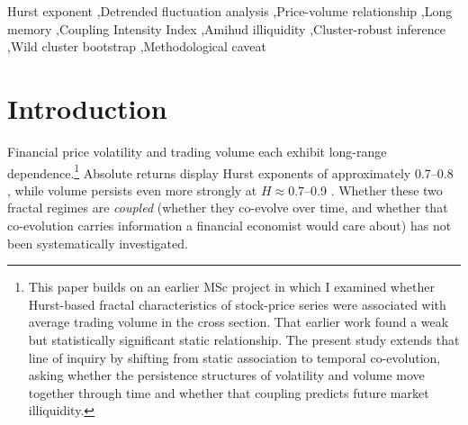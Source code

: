 \documentclass[preprint,12pt,authoryear]{elsarticle}
\begin{document}
\begin{frontmatter}
\begin{abstract}
the combined horse-race specification. An apparently strong predictive result against a non-standard share-volume illiquidity proxy dissipates once both proper Amihud convention and dependence-robust inference are imposed; I document and dissect this as a price-level confound. The contribution is therefore a strong and replicable within-firm fractal coupling phenomenon, a firm-conditional predictive null that holds across the modern cluster-robust toolkit, and three methodological observations for the wider econophysics-meets-finance literature: distinguish share-volume from dollar-volume liquidity proxies, be alert to the sensitivity of a result to the inference dimension when residual dependence is strong on both dimensions, and treat the Bell--McCaffrey Satterthwaite df as a routine diagnostic rather than assuming it scales with cluster count.
\end{abstract}

\begin{keyword}
Hurst exponent \sep Detrended fluctuation analysis \sep Price-volume relationship \sep Long memory \sep Coupling Intensity Index \sep Amihud illiquidity \sep Cluster-robust inference \sep Wild cluster bootstrap \sep Methodological caveat
\end{keyword}

\end{frontmatter}

\section{Introduction}
\label{sec:intro}

Financial price volatility and trading volume each exhibit long-range dependence.\footnote{This paper builds on an earlier MSc project \citep{hari2013fractal} in which I examined whether Hurst-based fractal characteristics of stock-price series were associated with average trading volume in the cross section. That earlier work found a weak but statistically significant static relationship. The present study extends that line of inquiry by shifting from static association to temporal co-evolution, asking whether the persistence structures of volatility and volume move together through time and whether that coupling predicts future market illiquidity.} Absolute returns display Hurst exponents of approximately 0.7--0.8 \citep{ding1993long, bollerslev1999equity}, while volume persists even more strongly at $H \approx 0.7$--0.9 \citep{lobato2000long}. Whether these two fractal regimes are \emph{coupled} (whether they co-evolve over time, and whether that co-evolution carries information a financial economist would care about) has not been systematically investigated.
\end{document}
